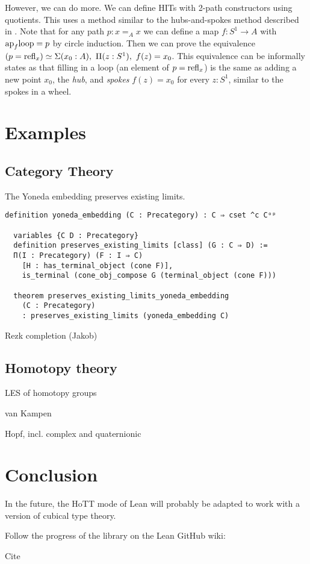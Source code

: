 \documentclass{llncs}
\newcommand{\fa}[2]{\ensuremath{\mathrm{\Pi}(#1),\ #2}}
\newcommand{\ex}[2]{\ensuremath{\mathrm{\Sigma}(#1),\ #2}}
\newcommand{\myap}{\textnormal{ap}}
\newcommand{\lp}{\textnormal{loop}}
\newcommand{\refl}{\textnormal{refl}}
\begin{document}
However, we can do more. We can define HITs with 2-path constructors using quotients. This uses a
method similar to the hubs-and-spokes method described in \cite[Section~6.7]{hottbook}. Note that
for any path $p : x =_A x$ we can define a map $f:S^1\to A$ with $\myap_f{\lp}=p$ by circle
induction. Then we can prove the equivalence $(p = \refl_{x})\simeq \ex{x_0 : A}{\fa{z :
    S^1}{f(z)=x_0}}$. This equivalence can be informally states as that filling in a loop (an
element of $p=\refl_{x}$) is the same as adding a new point $x_0$, the \emph{hub}, and \emph{spokes}
$f(z)=x_0$ for every $z : S^1$, similar to the spokes in a wheel.


\section{Examples}
\label{sec:examples}

\subsection{Category Theory}
The Yoneda embedding preserves existing limits.
\begin{lstlisting}[gobble=2]
  definition yoneda_embedding (C : Precategory) : C ⇒ cset ^c Cᵒᵖ

  variables {C D : Precategory}
  definition preserves_existing_limits [class] (G : C ⇒ D) :=
  Π(I : Precategory) (F : I ⇒ C)
    [H : has_terminal_object (cone F)],
    is_terminal (cone_obj_compose G (terminal_object (cone F)))

  theorem preserves_existing_limits_yoneda_embedding
    (C : Precategory)
    : preserves_existing_limits (yoneda_embedding C)
\end{lstlisting}

Rezk completion (Jakob)

\subsection{Homotopy theory}

LES of homotopy groups

van Kampen

Hopf, incl. complex and quaternionic

\section{Conclusion}
\label{sec:conclusion}

In the future, the HoTT mode of Lean will probably be adapted to work
with a version of cubical type theory.

Follow the progress of the library on the Lean GitHub wiki:

Cite \cite{bauer2016coqhott}



\end{document}
